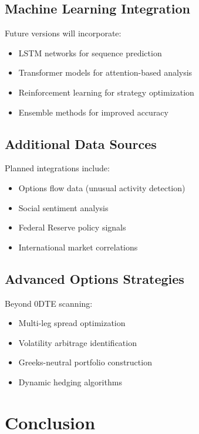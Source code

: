 \documentclass[12pt,a4paper]{article}
\begin{document}
\subsection{Machine Learning Integration}

Future versions will incorporate:

\begin{itemize}
    \item LSTM networks for sequence prediction
    \item Transformer models for attention-based analysis
    \item Reinforcement learning for strategy optimization
    \item Ensemble methods for improved accuracy
\end{itemize}

\subsection{Additional Data Sources}

Planned integrations include:

\begin{itemize}
    \item Options flow data (unusual activity detection)
    \item Social sentiment analysis
    \item Federal Reserve policy signals
    \item International market correlations
\end{itemize}

\subsection{Advanced Options Strategies}

Beyond 0DTE scanning:

\begin{itemize}
    \item Multi-leg spread optimization
    \item Volatility arbitrage identification
    \item Greeks-neutral portfolio construction
    \item Dynamic hedging algorithms
\end{itemize}

\section{Conclusion}
\end{document}
